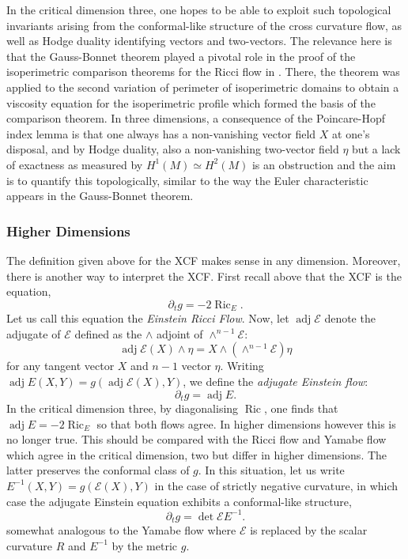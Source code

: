\documentclass[12pt]{amsart}
\begin{document}
In the critical dimension three, one hopes to be able to exploit such topological invariants arising from the conformal-like structure of the cross curvature flow, as well as Hodge duality identifying vectors and two-vectors. The relevance here is that the Gauss-Bonnet theorem played a pivotal role in the proof of the isoperimetric comparison theorems for the Ricci flow in \cite{Bryan,MR2729306}. There, the theorem was applied to the second variation of perimeter of isoperimetric domains to obtain a viscosity equation for the isoperimetric profile which formed the basis of the comparison theorem. In three dimensions, a consequence of the Poincare-Hopf index lemma is that one always has a non-vanishing vector field $X$ at one's disposal, and by Hodge duality, also a non-vanishing two-vector field $\eta$ but a lack of exactness as measured by $H^1(M) \simeq H^2(M)$ is an obstruction and the aim is to quantify this topologically, similar to the way the Euler characteristic appears in the Gauss-Bonnet theorem.

\subsubsection*{Higher Dimensions}
\label{sec-3-7-3}

The definition given above for the XCF makes sense in any dimension. Moreover, there is another way to interpret the XCF. First recall above that the XCF is the equation,
\[
\partial_t g = -2 \operatorname{Ric}_E.
\]
Let us call this equation the \emph{Einstein Ricci Flow}. Now, let $\operatorname{adj} \mathcal{E}$ denote the adjugate of $\mathcal{E}$ defined as the $\wedge$ adjoint of $\wedge^{n-1} \mathcal{E}$:
\[
\operatorname{adj} \mathcal{E} (X) \wedge \eta = X \wedge (\wedge^{n-1} \mathcal{E}) \eta
\]
for any tangent vector $X$ and $n-1$ vector $\eta$. Writing $\operatorname{adj} E (X, Y) = g(\operatorname{adj} \mathcal{E} (X), Y)$, we define the \emph{adjugate Einstein flow}:
\[
\partial_t g = \operatorname{adj} E.
\]
In the critical dimension three, by diagonalising $\operatorname{Ric}$, one finds that $\operatorname{adj} E = -2\operatorname{Ric}_E$ so that both flows agree. In higher dimensions however this is no longer true. This should be compared with the Ricci flow and Yamabe flow which agree in the critical dimension, two but differ in higher dimensions. The latter preserves the conformal class of $g$. In this situation, let us write $E^{-1}(X, Y) = g(\mathcal{E} (X), Y)$ in the case of strictly negative curvature, in which case the adjugate Einstein equation exhibits a conformal-like structure,
\[
\partial_t g = \det \mathcal{E} E^{-1}.
\]
somewhat analogous to the Yamabe flow where $\mathcal{E}$ is replaced by the scalar curvature $R$ and $E^{-1}$ by the metric $g$.
\end{document}
